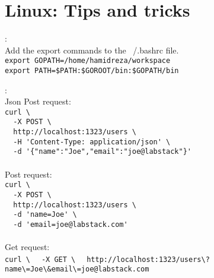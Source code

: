 \chapter{Linux: Tips and tricks}
\begin{note}:\\
Add the export commands to the ~/.bashrc file.\\
\verb|export GOPATH=/home/hamidreza/workspace|\\
\verb|export PATH=$PATH:$GOROOT/bin:$GOPATH/bin|
\end{note}
\begin{note}:\\
Json Post request:\\
\verb|curl \|\\
\verb|	-X POST \|\\
\verb|	http://localhost:1323/users \|\\
\verb|	-H 'Content-Type: application/json' \|\\
\verb|	-d '{"name":"Joe","email":"joe@labstack"}'|\\\\
Post request:\\
\verb|curl \|\\
\verb|	-X POST \|\\
\verb|	http://localhost:1323/users \|\\
\verb|	-d 'name=Joe' \|\\
\verb|	-d 'email=joe@labstack.com'|\\\\
Get request: \\
\verb|curl \|
\verb|	-X GET \|
\verb|	http://localhost:1323/users\?name\=Joe\&email\=joe@labstack.com|
\end{note}